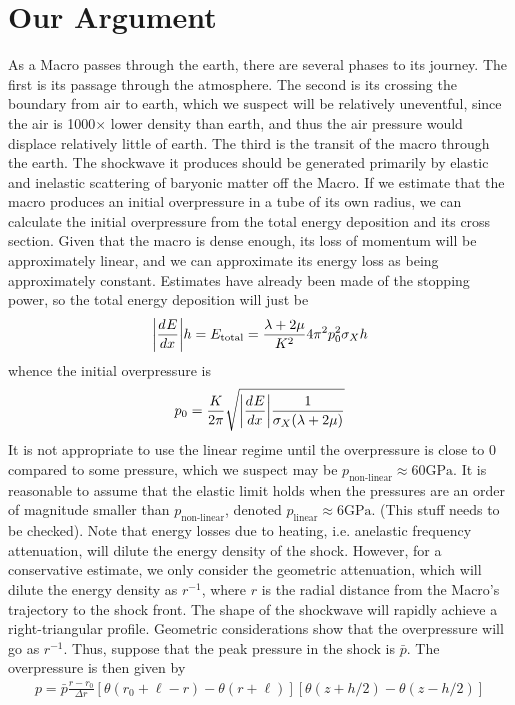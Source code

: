 \documentclass{article}
\newcommand*\te[1]{\text{#1}}
\newcommand*\ps[1]{\left[#1\right]}
\newcommand*\f[2]{\frac{#1}{#2}}
\newcommand*\td[3]{\frac{d^{#3}#1}{d #2^{#3}}}
\begin{document}
\section{Our Argument}
As a Macro passes through the earth, there are several phases to its journey. The first is its passage through the atmosphere. The second is its crossing the boundary from air to earth, which we suspect will be relatively uneventful, since the air is 1000$\times$ lower density than earth, and thus the air pressure would displace relatively little of earth. The third is the transit of the macro through the earth. The shockwave it produces should be generated primarily by elastic and inelastic scattering of baryonic matter off the Macro. If we estimate that the macro produces an initial overpressure in a tube of its own radius, we can calculate the initial overpressure from the total energy deposition and its cross section. Given that the macro is dense enough, its loss of momentum will be approximately linear, and we can approximate its energy loss as being approximately constant. Estimates have already been made of the stopping power, so the total energy deposition will just be
\begin{align}
\abs{\td{E}{x}{}}h=E_{\te{total}}=\f{\lambda+2\mu}{K^2}4\pi^2p_0^2\sigma_Xh
\end{align}
whence the initial overpressure is
\begin{align}
p_0=\f{K}{2\pi}\sqrt{\abs{\td{E}{x}{}}\f{1}{\sigma_X(\lambda+2\mu)}}
\end{align}
It is not appropriate to use the linear regime until the overpressure is close to 0 compared to some pressure, which we suspect may be $p_{\te{non-linear}}\approx60\te{GPa}$. It is reasonable to assume that the elastic limit holds when the pressures are an order of magnitude smaller than $p_{\te{non-linear}}$, denoted $p_{\te{linear}}\approx6\te{GPa}$. (This stuff needs to be checked). Note that energy losses due to heating, i.e. anelastic frequency attenuation, will dilute the energy density of the shock. However, for a conservative  estimate, we only consider the geometric attenuation, which will dilute the energy density as $r^{-1}$, where $r$ is the radial distance from the Macro's trajectory to the shock front. The shape of the shockwave will rapidly achieve a right-triangular profile. Geometric considerations show that the overpressure will go as $r^{-1}$. Thus, suppose that the peak pressure in the shock is $\bar p$. The overpressure is then given by
\begin{align}
p=\bar p\f{r-r_0}{\Delta r}\ps{\theta(r_0+\ell-r)-\theta(r+\ell)}\ps{\theta(z+h/2)-\theta(z-h/2)}
\end{align}
\end{document}
